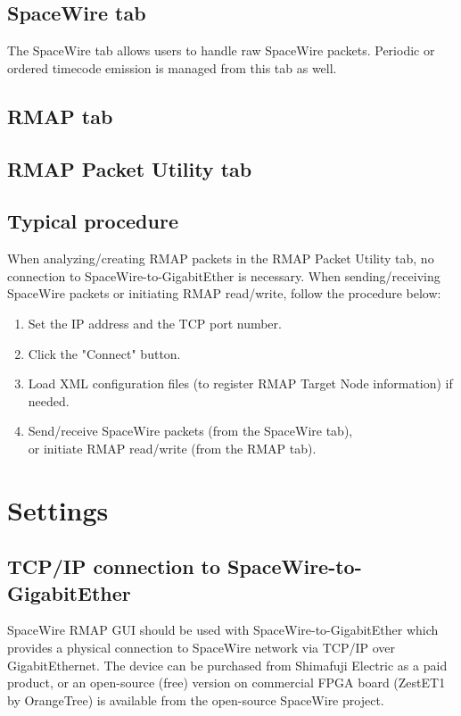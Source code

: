 \documentclass[a4paper,10pt]{article}
\begin{document}
\subsection{SpaceWire tab}
The SpaceWire tab allows users to handle raw SpaceWire packets.
Periodic or ordered timecode emission is managed from this tab as well.

\subsection{RMAP tab}

\subsection{RMAP Packet Utility tab}

\subsection{Typical procedure}
When analyzing/creating RMAP packets in the RMAP Packet Utility tab, no connection to SpaceWire-to-GigabitEther is necessary.
When sending/receiving SpaceWire packets or initiating RMAP read/write, follow the procedure below:
\begin{enumerate}
  \setlength{\parskip}{0cm}
  \setlength{\itemsep}{0cm}
\item Set the IP address and the TCP port number.
\item Click the "Connect" button.
\item Load XML configuration files (to register RMAP Target Node information) if needed.
\item Send/receive SpaceWire packets (from the SpaceWire tab), \\
or initiate RMAP read/write (from the RMAP tab).\\
\end{enumerate}




\section{Settings}
\subsection{TCP/IP connection to SpaceWire-to-GigabitEther}\label{section:setting_section}
SpaceWire RMAP GUI should be used with SpaceWire-to-GigabitEther which provides a physical connection to SpaceWire network via TCP/IP over GigabitEthernet. The device can be purchased from Shimafuji Electric as a paid product, or an open-source (free) version on commercial FPGA board (ZestET1 by OrangeTree) is available from the open-source SpaceWire project.
\end{document}
